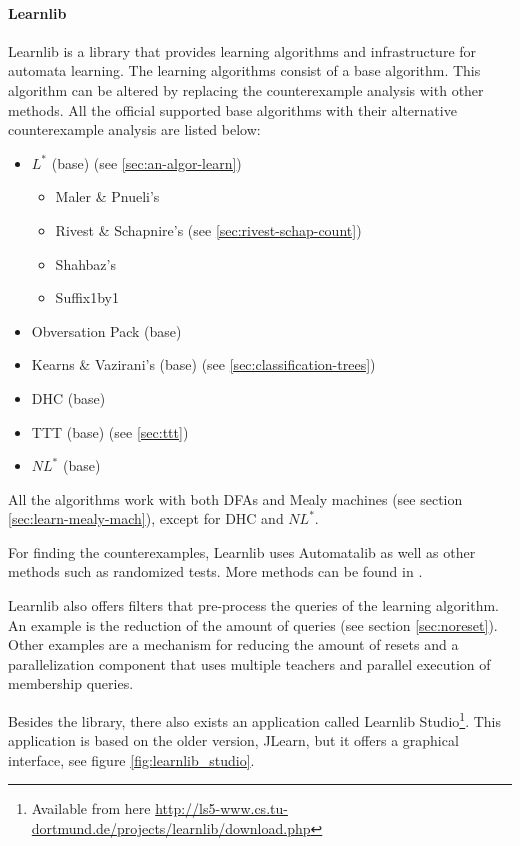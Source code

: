 \documentclass[multi,crop=false,class=article]{standalone}
\begin{document}
\paragraph{Learnlib} Learnlib is a library that provides learning algorithms and
infrastructure for automata learning. The learning algorithms consist of a base
algorithm. This algorithm can be altered by replacing the counterexample
analysis with other methods. All the official supported base algorithms with
their alternative counterexample analysis are listed below:

\begin{itemize}
	\item $L^*$ (base) (see \cref{sec:an-algor-learn})
	\begin{itemize}
		\item Maler \& Pnueli's \cite{Maler1995}
		\item Rivest \& Schapnire's (see \cref{sec:rivest-schap-count})
		\item Shahbaz's \cite{Shahbaz2009}
		\item Suffix1by1 \cite{Irfan2010}
	\end{itemize}
	\item Obversation Pack (base) \cite{Howar2012a}
	\item Kearns \& Vazirani's (base) (see \cref{sec:classification-trees})
	\item DHC (base) \cite{Merten2012}
	\item TTT (base) (see \cref{sec:ttt})
	\item $NL^*$ (base) \cite{Bollig2009}
\end{itemize}

All the algorithms work with both DFAs and Mealy machines (see section
\ref{sec:learn-mealy-mach}), except for DHC\cite{Merten2012} and
$NL^*$\cite{Bollig2009}.

For finding the counterexamples, Learnlib uses Automatalib as well as other
methods such as randomized tests. More methods can be found in
\cite[p. 490]{Isberner2015b}.

Learnlib also offers filters that pre-process the queries of the learning
algorithm. An example is the reduction of the amount of queries (see section
\ref{sec:noreset}). Other examples are a mechanism for reducing the amount of
resets  and a parallelization component that uses multiple teachers and
parallel execution of membership queries\cite{Henrix2015,Howar2012}.


Besides the library, there also exists an application called Learnlib 
Studio\footnote{Available from here 
	\url{http://ls5-www.cs.tu-dortmund.de/projects/learnlib/download.php}}. 
	This application is based on the older version, JLearn, but it offers a 
	graphical interface, see figure \ref{fig:learnlib_studio}. 
	
\end{document}
